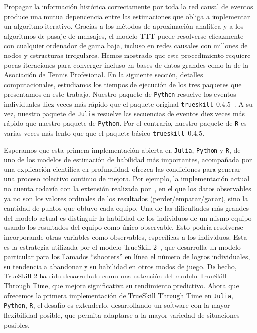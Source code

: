 \documentclass[a4paper,11pt]{book}
\theoremstyle{definition}
\begin{document}
Propagar la información histórica correctamente por toda la red causal de eventos produce una mutua dependencia entre las estimaciones que obliga a implementar un algoritmo iterativo.
%
Gracias a los métodos de aproximación analítica y a los algoritmos de pasaje de mensajes, el modelo TTT puede resolverse eficazmente con cualquier ordenador de gama baja, incluso en redes causales con millones de nodos y estructuras irregulares.
%
Hemos mostrado que este procedimiento requiere pocas iteraciones para converger incluso en bases de datos grandes como la de la Asociación de Tennis Profesional.
%
En la siguiente sección, detalles computacionales, estudiamos los tiempos de ejecución de los tres paquetes que presentamos en este trabajo.
%
Nuestro paquete de \texttt{Python} resuelve los eventos individuales diez veces más rápido que el paquete original \texttt{trueskill}~$0.4.5$~\cite{Lee2012}.
%
A su vez, nuestro paquete de \texttt{Julia} resuelve las secuencias de eventos diez veces más rápido  que nuestro paquete de \texttt{Python}.
%
Por el contrario, nuestro paquete de \texttt{R} es varias veces más lento que que el paquete básico \texttt{trueskill}~$0.4.5$.

Esperamos que esta primera implementaci\'on abierta en \texttt{Julia}, \texttt{Python} y \texttt{R}, de uno de los modelos de estimaci\'on de habilidad más importantes, acompañada por una explicaci\'on científica en profundidad, ofrezca las condiciones para generar una proceso colectivo continuo de mejora.
%
Por ejemplo, la implementación actual no cuenta todavía con la extensión realizada por~\cite{Guo2012}, en el que los datos observables ya no son los valores ordinales de los resultados (perder/empatar/ganar), sino la cantidad de puntos que obtuvo cada equipo.
%
Una de las dificultades más grandes del modelo actual es distinguir la habilidad de los individuos de un mismo equipo usando los resultados del equipo como único observable.
%
Esto podría resolverse incorporando otras variables como observables, específicas a los individuos.
%
Esta es la estrategia utilizada por el modelo TrueSkill 2~\cite{minka2018-trueskill2}, que desarrolla un modelo particular para los llamados ``shooters'' en línea el número de logros individuales, su tendencia a abandonar y su habilidad en otros modos de juego.
%
De hecho, TrueSkill 2 ha sido desarrollado como una extensión del modelo TrueSkill Through Time, que mejora significativa su rendimiento predictivo.
%
Ahora que ofrecemos la primera implementación de TrueSkill Through Time en \texttt{Julia}, \texttt{Python}, \texttt{R}, el desafío es extenderlo, desarrollando un software con la mayor flexibilidad posible, que permita adaptarse a la mayor variedad de situaciones posibles.
%
%
\end{document}

